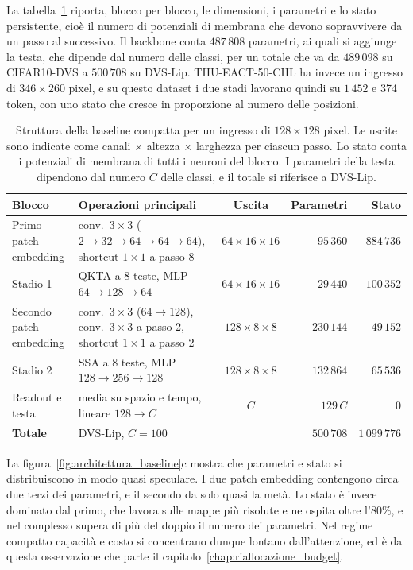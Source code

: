 La tabella~\ref{tab:architettura_baseline} riporta, blocco per blocco, le dimensioni, i parametri e lo stato persistente, cioè il numero di potenziali di membrana che devono sopravvivere da un passo al successivo. Il backbone conta $487\,808$ parametri, ai quali si aggiunge la testa, che dipende dal numero delle classi, per un totale che va da $489\,098$ su CIFAR10-DVS a $500\,708$ su DVS-Lip. THU-EACT-50-CHL ha invece un ingresso di $346\times260$ pixel, e su questo dataset i due stadi lavorano quindi su $1\,452$ e 374 token, con uno stato che cresce in proporzione al numero delle posizioni.

\begin{table}[t]
\centering
\small
\renewcommand{\arraystretch}{1.2}
\caption[Struttura della baseline compatta]{Struttura della baseline compatta per un ingresso di $128\times128$ pixel. Le uscite sono indicate come canali $\times$ altezza $\times$ larghezza per ciascun passo. Lo stato conta i potenziali di membrana di tutti i neuroni del blocco. I parametri della testa dipendono dal numero $C$ delle classi, e il totale si riferisce a DVS-Lip.}
\label{tab:architettura_baseline}
\begin{tabularx}{\textwidth}{@{}>{\raggedright\arraybackslash}p{2.6cm} >{\raggedright\arraybackslash}X c r r@{}}
\hline
\textbf{Blocco} & \textbf{Operazioni principali} & \textbf{Uscita} & \textbf{Parametri} & \textbf{Stato} \\
\hline
Primo patch embedding & 4 conv.\ $3\times3$ ($2\to32\to64\to64\to64$), shortcut $1\times1$ a passo 8 & $64\times16\times16$ & $95\,360$ & $884\,736$ \\
Stadio 1 & QKTA a 8 teste, MLP $64\to128\to64$ & $64\times16\times16$ & $29\,440$ & $100\,352$ \\
Secondo patch embedding & conv.\ $3\times3$ ($64\to128$), conv.\ $3\times3$ a passo 2, shortcut $1\times1$ a passo 2 & $128\times8\times8$ & $230\,144$ & $49\,152$ \\
Stadio 2 & SSA a 8 teste, MLP $128\to256\to128$ & $128\times8\times8$ & $132\,864$ & $65\,536$ \\
Readout e testa & media su spazio e tempo, lineare $128\to C$ & $C$ & $129\,C$ & 0 \\
\hline
\textbf{Totale} & DVS-Lip, $C=100$ & & $500\,708$ & $1\,099\,776$ \\
\hline
\end{tabularx}
\end{table}

La figura~\ref{fig:architettura_baseline}c mostra che parametri e stato si distribuiscono in modo quasi speculare. I due patch embedding contengono circa due terzi dei parametri, e il secondo da solo quasi la metà. Lo stato è invece dominato dal primo, che lavora sulle mappe più risolute e ne ospita oltre l'$80\%$, e nel complesso supera di più del doppio il numero dei parametri. Nel regime compatto capacità e costo si concentrano dunque lontano dall'attenzione, ed è da questa osservazione che parte il capitolo~\ref{chap:riallocazione_budget}.

